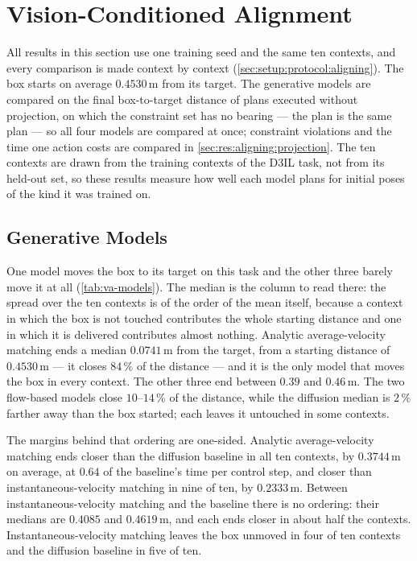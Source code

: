 \section{Vision-Conditioned Alignment}\label{sec:res:visual}

All results in this section use one training seed and the same ten contexts, and every comparison is made
context by context (\autoref{sec:setup:protocol:aligning}). The box starts on average $0.4530$\,m
from its target. The generative models are compared on the final box-to-target distance of plans executed
without projection, on which the constraint set has no bearing --- the plan is the same plan --- so all
four models are compared at once; constraint violations and the time one action costs are compared in
\autoref{sec:res:aligning:projection}.
The ten contexts are drawn from the training contexts of the D3IL task, not from its held-out set,
so these results measure how well each model plans for initial poses of the kind it was trained on.

\subsection{Generative Models}\label{sec:res:aligning:models}

One model moves the box to its target on this task and the other three barely move it at all
(\autoref{tab:va-models}). The median is the column to read there: the spread over the ten contexts is
of the order of the mean itself, because a context in which the box is not touched contributes the whole
starting distance and one in which it is delivered contributes almost nothing. Analytic average-velocity matching ends a median $0.0741$\,m from the target,
from a starting distance of $0.4530$\,m --- it closes $84\,\%$ of the distance --- and it is the only model
that moves the box in every context. The other three end between $0.39$ and $0.46$\,m. The two
flow-based models close $10$--$14\,\%$ of the distance, while the diffusion median is $2\,\%$ farther
away than the box started; each leaves it untouched in some contexts.

The margins behind that ordering are one-sided. Analytic average-velocity matching ends closer than the
diffusion baseline in all ten contexts, by $0.3744$\,m on average, at $0.64$ of the baseline's time per
control step, and closer than instantaneous-velocity matching in nine of ten, by $0.2333$\,m. Between
instantaneous-velocity matching and the baseline there is no ordering: their medians are $0.4085$ and
$0.4619$\,m, and each ends closer in about half the contexts. Instantaneous-velocity matching leaves the
box unmoved in four of ten contexts and the diffusion baseline in five of ten.


